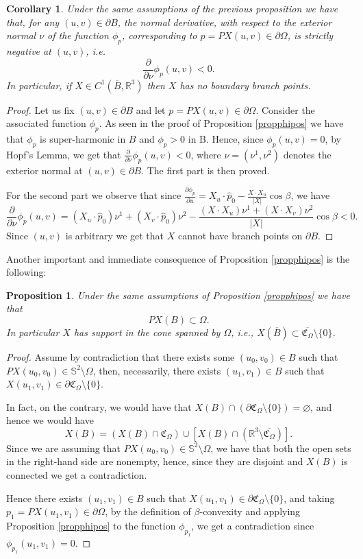 \documentclass[a4paper,reqno,10pt,oneside]{amsart}
\numberwithin{equation}{section}
\newtheorem{proposition}[theorem]{Proposition}
\newtheorem{corollary}[theorem]{Corollary}
\begin{document}
\begin{corollary}\label{cor1hopf}
Under the same assumptions of the previous proposition we have that, for any $(u,v) \in \partial B$, the normal derivative, with respect to the exterior normal $\nu$ of the function $\phi_p$, corresponding to $p=PX(u,v) \in \partial \Omega$, is strictly negative at $(u,v)$, i.e. $$\frac{\partial}{\partial \nu}\phi_p(u,v)<0.$$ In particular, if $X \in C^1(\overline B, {\mathbb R}^3)$ then $X$ has no boundary branch points.
\end{corollary}
\begin{proof}
Let us fix $(u,v) \in \partial B$ and let $p=PX(u,v) \in\partial\Omega$. Consider the associated function $\phi_p$. As seen in the proof of Proposition \ref{propphipos} we have that $\phi_p$ is super-harmonic in $B$ and  $\phi_p>0$ in B. Hence, since $\phi_p(u,v)=0$, by Hopf's Lemma, we get that $\frac{\partial}{\partial \nu}\phi_p(u,v)<0$, where $\nu=(\nu^1, \nu^2)$ denotes the exterior normal at $(u,v) \in \partial B$. The first part is then proved. 

For the second part we observe that since $\frac{\partial\phi_p}{\partial u} = X_u \cdot \hat p_0 - \frac{X \cdot X_u}{|X|} \cos \beta$, we have
$$\frac{\partial}{\partial \nu}\phi_p(u,v)= (X_u \cdot \hat p_0) \nu^1 + (X_v \cdot \hat p_0) \nu^2 -  \frac{(X \cdot X_u) \nu^1 + (X \cdot X_v) \nu^2 }{|X|} \cos \beta < 0.$$
Since $(u,v)$ is arbitrary we get that $X$ cannot have branch points on $\partial B$.
\end{proof}
Another important and immediate consequence of Proposition \ref{propphipos} is the following:

\begin{proposition}\label{propprojcontomega}
Under the same assumptions of Proposition \ref{propphipos} we have that $$PX(B) \subset \Omega.$$
In particular $X$ has support in the cone spanned by $\Omega$, i.e., $X(\overline B) \subset \overline{\mathfrak{C}_\Omega} \setminus \{0\}$.
\end{proposition}

\begin{proof}
Assume by contradiction that there exists some $(u_0,v_0) \in B$ such that $PX(u_0,v_0) \in \mathbb{S}^2\setminus \Omega$, then, necessarily, there exists $(u_1,v_1) \in B$ such that $X(u_1,v_1) \in \partial\mathfrak{C}_\Omega\setminus\{0\}$. 

In fact, on the contrary, we would have that $X(B) \cap ( \partial\mathfrak{C}_\Omega\setminus\{0\}) = \varnothing$, and hence we would have $$X(B)=(X(B)\cap \mathfrak{C}_\Omega) \cup [X(B)\cap ({\mathbb R}^3\setminus \overline {\mathfrak{C}_\Omega})].$$
Since we are assuming that $PX(u_0,v_0) \in \mathbb{S}^2\setminus \Omega$, we have that both the open sets in the right-hand side are nonempty, hence, since they are disjoint and $X(B)$ is connected we get a contradiction.

Hence there exists $(u_1,v_1) \in B$ such that $X(u_1,v_1) \in \partial\mathfrak{C}_\Omega\setminus\{0\}$, and taking $p_1=PX(u_1,v_1) \in \partial \Omega$, by the definition of $\beta$-convexity and applying Proposition \ref{propphipos} to the function $\phi_{p_1}$, we get a contradiction since $\phi_{p_1}(u_1,v_1)=0$.
\end{proof}
\end{document}
